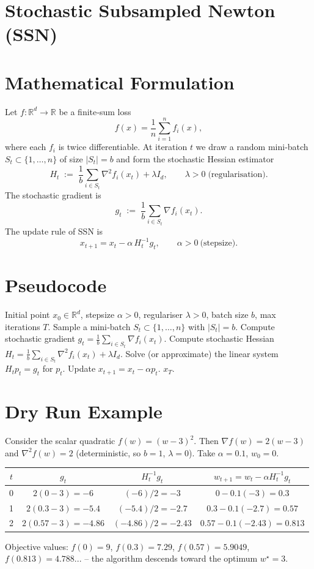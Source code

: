 \documentclass{article}
\begin{document}
\section*{Stochastic Subsampled Newton (SSN)}

\section*{Mathematical Formulation}
Let $f:\mathbb{R}^{d}\rightarrow\mathbb{R}$ be a finite‑sum loss
\[
f(x)=\frac{1}{n}\sum_{i=1}^{n} f_i(x),
\]
where each $f_i$ is twice differentiable.  
At iteration $t$ we draw a random mini‑batch $S_t\subset\{1,\dots,n\}$ of size $|S_t|=b$ and form the stochastic Hessian estimator
\[
H_t \;:=\; \frac{1}{b}\sum_{i\in S_t}\nabla^{2}f_i(x_t)+\lambda I_d,
\qquad \lambda>0\;\text{(regularisation)}. \tag{1}
\]
The stochastic gradient is
\[
g_t \;:=\; \frac{1}{b}\sum_{i\in S_t}\nabla f_i(x_t). \tag{2}
\]
The update rule of SSN is
\[
x_{t+1}=x_{t}-\alpha\, H_t^{-1} g_t, \qquad \alpha>0 \ \text{(stepsize)}. \tag{3}
\]

\section*{Pseudocode}
\begin{algorithm}[H]
\caption{Stochastic Subsampled Newton (SSN)}
\begin{algorithmic}[1]
\REQUIRE Initial point $x_0\in\mathbb{R}^d$, stepsize $\alpha>0$, regulariser $\lambda>0$, batch size $b$,
max iterations $T$.
    \STATE Sample a mini‑batch $S_t\subset\{1,\dots,n\}$ with $|S_t|=b$.
    \STATE Compute stochastic gradient $g_t=\frac{1}{b}\sum_{i\in S_t}\nabla f_i(x_t)$.
    \STATE Compute stochastic Hessian $H_t=\frac{1}{b}\sum_{i\in S_t}\nabla^{2}f_i(x_t)+\lambda I_d$.
    \STATE Solve (or approximate) the linear system $H_t p_t = g_t$ for $p_t$.
    \STATE Update $x_{t+1}=x_t-\alpha p_t$.
\ENDFOR
\RETURN $x_T$.
\end{algorithmic}
\end{algorithm}

\section*{Dry Run Example}
Consider the scalar quadratic $f(w)=(w-3)^2$.  
Then $\nabla f(w)=2(w-3)$ and $\nabla^{2}f(w)=2$ (deterministic, so $b=1$, $\lambda=0$).  
Take $\alpha=0.1$, $w_0=0$.

\begin{center}
\begin{tabular}{c|c|c|c}
$t$ & $g_t$ & $H_t^{-1}g_t$ & $w_{t+1}=w_t-\alpha H_t^{-1}g_t$ \\ \hline
0 & $2(0-3)=-6$ & $(-6)/2=-3$ & $0-0.1(-3)=0.3$ \\
1 & $2(0.3-3)=-5.4$ & $(-5.4)/2=-2.7$ & $0.3-0.1(-2.7)=0.57$ \\
2 & $2(0.57-3)=-4.86$ & $(-4.86)/2=-2.43$ & $0.57-0.1(-2.43)=0.813$ \\
\end{tabular}
\end{center}
Objective values: $f(0)=9$, $f(0.3)=7.29$, $f(0.57)=5.9049$, $f(0.813)=4.788...$ – the algorithm descends toward the optimum $w^\star=3$.
\end{document}
